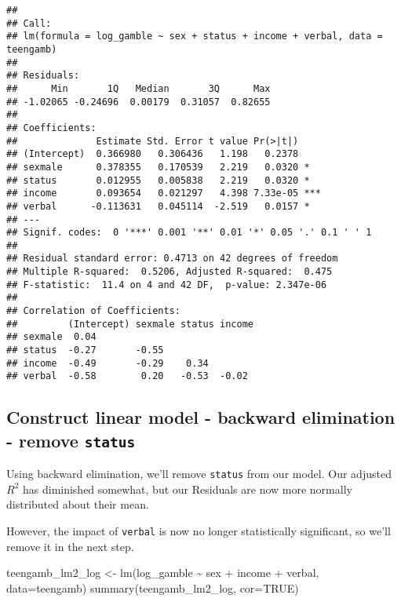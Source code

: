 \documentclass[
]{article}
\newenvironment{Shaded}{\begin{snugshade}}{\end{snugshade}}
\newcommand{\AttributeTok}[1]{\textcolor[rgb]{0.77,0.63,0.00}{#1}}
\newcommand{\ConstantTok}[1]{\textcolor[rgb]{0.00,0.00,0.00}{#1}}
\newcommand{\FunctionTok}[1]{\textcolor[rgb]{0.00,0.00,0.00}{#1}}
\newcommand{\NormalTok}[1]{#1}
\newcommand{\OtherTok}[1]{\textcolor[rgb]{0.56,0.35,0.01}{#1}}
\newcommand{\SpecialCharTok}[1]{\textcolor[rgb]{0.00,0.00,0.00}{#1}}
\begin{document}
\begin{verbatim}
## 
## Call:
## lm(formula = log_gamble ~ sex + status + income + verbal, data = teengamb)
## 
## Residuals:
##      Min       1Q   Median       3Q      Max 
## -1.02065 -0.24696  0.00179  0.31057  0.82655 
## 
## Coefficients:
##              Estimate Std. Error t value Pr(>|t|)    
## (Intercept)  0.366980   0.306436   1.198   0.2378    
## sexmale      0.378355   0.170539   2.219   0.0320 *  
## status       0.012955   0.005838   2.219   0.0320 *  
## income       0.093654   0.021297   4.398 7.33e-05 ***
## verbal      -0.113631   0.045114  -2.519   0.0157 *  
## ---
## Signif. codes:  0 '***' 0.001 '**' 0.01 '*' 0.05 '.' 0.1 ' ' 1
## 
## Residual standard error: 0.4713 on 42 degrees of freedom
## Multiple R-squared:  0.5206, Adjusted R-squared:  0.475 
## F-statistic:  11.4 on 4 and 42 DF,  p-value: 2.347e-06
## 
## Correlation of Coefficients:
##         (Intercept) sexmale status income
## sexmale  0.04                            
## status  -0.27       -0.55                
## income  -0.49       -0.29    0.34        
## verbal  -0.58        0.20   -0.53  -0.02
\end{verbatim}

\hypertarget{construct-linear-model---backward-elimination---remove-status}{%
\subsection{\texorpdfstring{Construct linear model - backward
elimination - remove
\texttt{status}}{Construct linear model - backward elimination - remove status}}\label{construct-linear-model---backward-elimination---remove-status}}

Using backward elimination, we'll remove \texttt{status} from our model.
Our adjusted \(R^2\) has diminished somewhat, but our Residuals are now
more normally distributed about their mean.

However, the impact of \texttt{verbal} is now no longer statistically
significant, so we'll remove it in the next step.

\begin{Shaded}
\begin{Highlighting}[]
\NormalTok{teengamb\_lm2\_log }\OtherTok{\textless{}{-}} \FunctionTok{lm}\NormalTok{(log\_gamble }\SpecialCharTok{\textasciitilde{}}\NormalTok{ sex }\SpecialCharTok{+}\NormalTok{ income }\SpecialCharTok{+}\NormalTok{ verbal, }\AttributeTok{data=}\NormalTok{teengamb)}
\FunctionTok{summary}\NormalTok{(teengamb\_lm2\_log, }\AttributeTok{cor=}\ConstantTok{TRUE}\NormalTok{)}
\end{Highlighting}
\end{Shaded}
\end{document}
